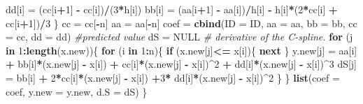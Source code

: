 \documentclass[
]{book}
\newenvironment{Shaded}{\begin{snugshade}}{\end{snugshade}}
\newcommand{\AttributeTok}[1]{\textcolor[rgb]{0.13,0.29,0.53}{#1}}
\newcommand{\CommentTok}[1]{\textcolor[rgb]{0.56,0.35,0.01}{\textit{#1}}}
\newcommand{\ConstantTok}[1]{\textcolor[rgb]{0.56,0.35,0.01}{#1}}
\newcommand{\ControlFlowTok}[1]{\textcolor[rgb]{0.13,0.29,0.53}{\textbf{#1}}}
\newcommand{\DecValTok}[1]{\textcolor[rgb]{0.00,0.00,0.81}{#1}}
\newcommand{\FunctionTok}[1]{\textcolor[rgb]{0.13,0.29,0.53}{\textbf{#1}}}
\newcommand{\NormalTok}[1]{#1}
\newcommand{\OtherTok}[1]{\textcolor[rgb]{0.56,0.35,0.01}{#1}}
\newcommand{\SpecialCharTok}[1]{\textcolor[rgb]{0.81,0.36,0.00}{\textbf{#1}}}
\begin{document}
\begin{Shaded}
\begin{Highlighting}[]
\NormalTok{    dd[i] }\OtherTok{=}\NormalTok{ (cc[i}\SpecialCharTok{+}\DecValTok{1}\NormalTok{] }\SpecialCharTok{{-}}\NormalTok{ cc[i])}\SpecialCharTok{/}\NormalTok{(}\DecValTok{3}\SpecialCharTok{*}\NormalTok{h[i])}
\NormalTok{    bb[i] }\OtherTok{=}\NormalTok{ (aa[i}\SpecialCharTok{+}\DecValTok{1}\NormalTok{] }\SpecialCharTok{{-}}\NormalTok{ aa[i])}\SpecialCharTok{/}\NormalTok{h[i] }\SpecialCharTok{{-}}\NormalTok{ h[i]}\SpecialCharTok{*}\NormalTok{(}\DecValTok{2}\SpecialCharTok{*}\NormalTok{cc[i] }\SpecialCharTok{+}\NormalTok{ cc[i}\SpecialCharTok{+}\DecValTok{1}\NormalTok{])}\SpecialCharTok{/}\DecValTok{3}
\NormalTok{  \}}
\NormalTok{  cc }\OtherTok{=}\NormalTok{ cc[}\SpecialCharTok{{-}}\NormalTok{n]}
\NormalTok{  aa }\OtherTok{=}\NormalTok{ aa[}\SpecialCharTok{{-}}\NormalTok{n]}
\NormalTok{  coef }\OtherTok{=} \FunctionTok{cbind}\NormalTok{(}\AttributeTok{ID =}\NormalTok{ ID, }\AttributeTok{aa =}\NormalTok{ aa, }\AttributeTok{bb =}\NormalTok{ bb, }\AttributeTok{cc =}\NormalTok{ cc, }\AttributeTok{dd =}\NormalTok{ dd)}
  \CommentTok{\#predicted value}
\NormalTok{  dS }\OtherTok{=} \ConstantTok{NULL}                       \CommentTok{\# derivative of the C{-}spline.}
  \ControlFlowTok{for}\NormalTok{ (j }\ControlFlowTok{in} \DecValTok{1}\SpecialCharTok{:}\FunctionTok{length}\NormalTok{(x.new))\{}
  \ControlFlowTok{for}\NormalTok{ (i }\ControlFlowTok{in} \DecValTok{1}\SpecialCharTok{:}\NormalTok{n)\{}
    \ControlFlowTok{if}\NormalTok{ (x.new[j]}\SpecialCharTok{\textless{}=}\NormalTok{ x[i])\{}
       \ControlFlowTok{next}
\NormalTok{      \}}
\NormalTok{     y.new[j] }\OtherTok{=}\NormalTok{ aa[i] }\SpecialCharTok{+}\NormalTok{ bb[i]}\SpecialCharTok{*}\NormalTok{(x.new[j] }\SpecialCharTok{{-}}\NormalTok{ x[i]) }\SpecialCharTok{+}\NormalTok{ cc[i]}\SpecialCharTok{*}\NormalTok{(x.new[j] }\SpecialCharTok{{-}}\NormalTok{ x[i])}\SpecialCharTok{\^{}}\DecValTok{2} \SpecialCharTok{+}\NormalTok{ dd[i]}\SpecialCharTok{*}\NormalTok{(x.new[j] }\SpecialCharTok{{-}}\NormalTok{ x[i])}\SpecialCharTok{\^{}}\DecValTok{3}
\NormalTok{     dS[j] }\OtherTok{=}\NormalTok{ bb[i] }\SpecialCharTok{+} \DecValTok{2}\SpecialCharTok{*}\NormalTok{cc[i]}\SpecialCharTok{*}\NormalTok{(x.new[j] }\SpecialCharTok{{-}}\NormalTok{ x[i]) }\SpecialCharTok{+}\DecValTok{3}\SpecialCharTok{*}\NormalTok{ dd[i]}\SpecialCharTok{*}\NormalTok{(x.new[j] }\SpecialCharTok{{-}}\NormalTok{ x[i])}\SpecialCharTok{\^{}}\DecValTok{2}
\NormalTok{   \}}
\NormalTok{  \}}
 \FunctionTok{list}\NormalTok{(}\AttributeTok{coef =}\NormalTok{ coef, }\AttributeTok{y.new =}\NormalTok{ y.new, }\AttributeTok{d.S =}\NormalTok{ dS)}
\NormalTok{\}}
\end{Highlighting}
\end{Shaded}
\end{document}
